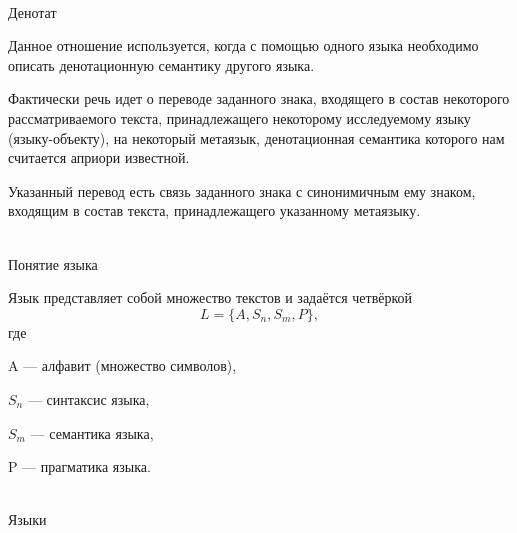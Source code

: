 \begin{frame}{\\Денотат}
	\topline
	\justifying
	\small
	
	Данное отношение используется, когда с помощью одного языка необходимо описать денотационную семантику другого языка. 
	
	\bigskip
	
	Фактически речь идет о переводе заданного знака, входящего в состав некоторого рассматриваемого текста, принадлежащего некоторому исследуемому языку (языку-объекту), на некоторый метаязык, денотационная семантика которого нам считается априори известной. 
	
	\bigskip
	
	Указанный перевод есть связь заданного знака с синонимичным ему знаком, входящим в состав текста, принадлежащего указанному метаязыку.
	
\end{frame}

\begin{frame}{\\Понятие языка}
	\topline
	\justifying
	
	Язык представляет собой множество текстов и задаётся четвёркой
	\[
	L = \{ A, S_n, S_m, P \},
	\]
	где
	
	A --- алфавит (множество символов),
	
	$S_n$ --- синтаксис языка,
	
	$S_m$ --- семантика языка,
	
	P --- прагматика языка.
	
\end{frame}

\begin{frame}{\\Языки}
	\topline
	\justifying
	
	\begin{SCn}
	\begin{scnindent}
	\end{scnindent}
	\end{SCn}
	
\end{frame}

